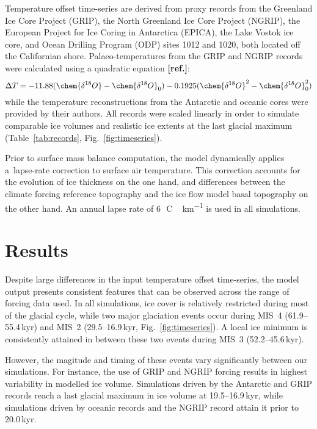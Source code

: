 \documentclass[tc, ms]{copernicus}
\newcommand{\aref}[0]{\textbf{[ref.]}}
\begin{document}
Temperature offset time-series are derived from proxy records from
the Greenland Ice Core Project (GRIP), the North Greenland Ice Core Project
(NGRIP), the European Project for Ice Coring in Antarctica (EPICA), the Lake
Vostok ice core, and Ocean Drilling Program (ODP) sites 1012 and 1020, both
located off the Californian shore. Palaeo-temperatures from the GRIP and NGRIP
records were calculated using a quadratic equation \aref:
\begin{equation}
    \Delta T = -11.88(\chem{\delta^{18}O}-\chem{\delta^{18}O}_0)
               -0.1925(\chem{\delta^{18}O}^2-\chem{\delta^{18}O}_0^2)
\end{equation}
while the temperature reconstructions from the Antarctic and oceanic cores were
provided by their authors. All records were scaled linearly in
order to simulate comparable ice volumes and realistic ice extents at the last
glacial maximum (Table~\ref{tab:records}, Fig.~\ref{fig:timeseries}).

Prior to surface mass balance computation, the model dynamically applies
a~lapse-rate correction to surface air temperature. This correction accounts
for the evolution of ice thickness on the one hand, and differences between the
climate forcing reference topography and the ice flow model basal topography on
the other hand.
An annual lapse rate of 6\,\unit{{\degree}C\,km^{-1}} is used in all
simulations.


\section{Results}
\label{sec:results}

Despite large differences in the input temperature offset time-series, the
model output presents consistent features that can be observed across the range
of forcing data used. In all simulations, ice cover is relatively restricted
during most of the glacial cycle, while two major glaciation events occur
during MIS~4 (61.9--55.4\,\unit{kyr}) and MIS~2 (29.5--16.9\,\unit{kyr},
Fig.~\ref{fig:timeseries}). A local ice minimum is consistently attained in between these
two events during MIS~3 (52.2--45.6\,\unit{kyr}).

However, the magitude and timing of these events vary significantly
between our simulations. For instance, the use of GRIP and NGRIP forcing
results in highest variability in modelled ice volume. Simulations driven by
the Antarctic and GRIP records reach a last glacial maximum in ice volume at
19.5--16.9\,\unit{kyr}, while simulations driven by oceanic records
and the NGRIP record attain it prior to 20.0\,\unit{kyr}.
\end{document}
